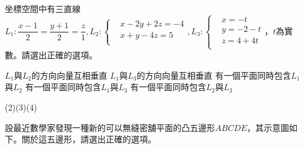 \begin{QUESTIONS}
\begin{QUESTION}
    \begin{QEMPTYSPACE}
    \end{QEMPTYSPACE}
\end{QUESTION}
\begin{QUESTION}
    \begin{QBODY}
        坐標空間中有三直線${{L}_{1}}:\dfrac{x-1}{2}=\dfrac{y+1}{2}=\dfrac{z}{1},{{L}_{2}}:\left\{ \begin{aligned}
        & x-2y+2z=-4 \\ 
        & x+y-4z=5 \\ 
        \end{aligned} \right.,{{L}_{3}}:\left\{ \begin{aligned}
        & x=-t \\ 
        & y=-2-t \\ 
        & z=4+4t \\ 
        \end{aligned} \right.$，$t$為實數。請選出正確的選項。
        \begin{QOPS}
            \QOP ${{L}_{1}}$與${{L}_{2}}$的方向向量互相垂直
            \QOP ${{L}_{1}}$與${{L}_{3}}$的方向向量互相垂直
            \QOP 有一個平面同時包含${{L}_{1}}$與${{L}_{2}}$
            \QOP 有一個平面同時包含${{L}_{1}}$與${{L}_{3}}$
            \QOP 有一個平面同時包含${{L}_{2}}$與${{L}_{3}}$
        \end{QOPS}
    \end{QBODY}
    \begin{QFROMS}
    \end{QFROMS}
    \begin{QTAGS}
    \end{QTAGS}
    \begin{QANS}
        (2)(3)(4)
    \end{QANS}
    \begin{QSOL}
    \end{QSOL}
    \begin{QEMPTYSPACE}
    \end{QEMPTYSPACE}
\end{QUESTION}
\begin{QUESTION}
    \begin{QBODY}
        設最近數學家發現一種新的可以無縫密舖平面的凸五邊形$ABCDE$，其示意圖如下。關於這五邊形，請選出正確的選項。
        
\end{QBODY}
\end{QUESTION}
\end{QUESTIONS}
